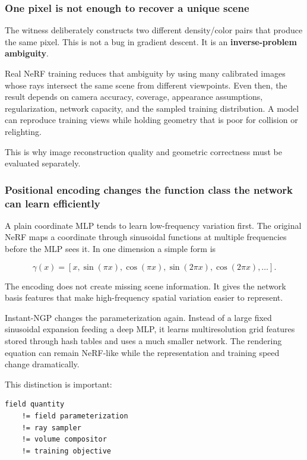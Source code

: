 \subsubsection{One pixel is not enough to recover a unique scene}\label{one-pixel-is-not-enough-to-recover-a-unique-scene}

The witness deliberately constructs two different density/color pairs that produce the same pixel. This is not a bug in gradient descent. It is an \textbf{inverse-problem ambiguity}.

Real NeRF training reduces that ambiguity by using many calibrated images whose rays intersect the same scene from different viewpoints. Even then, the result depends on camera accuracy, coverage, appearance assumptions, regularization, network capacity, and the sampled training distribution. A model can reproduce training views while holding geometry that is poor for collision or relighting.

This is why image reconstruction quality and geometric correctness must be evaluated separately.

\subsubsection{Positional encoding changes the function class the network can learn efficiently}\label{positional-encoding-changes-the-function-class-the-network-can-learn-efficiently}

A plain coordinate MLP tends to learn low-frequency variation first. The original NeRF maps a coordinate through sinusoidal functions at multiple frequencies before the MLP sees it. In one dimension a simple form is

\[\gamma(x)=\left[x,\sin(\pi x),\cos(\pi x),\sin(2\pi x),\cos(2\pi x),\ldots\right].\]

The encoding does not create missing scene information. It gives the network basis features that make high-frequency spatial variation easier to represent.

Instant-NGP changes the parameterization again. Instead of a large fixed sinusoidal expansion feeding a deep MLP, it learns multiresolution grid features stored through hash tables and uses a much smaller network. The rendering equation can remain NeRF-like while the representation and training speed change dramatically.

This distinction is important:

\begin{verbatim}
field quantity
    != field parameterization
    != ray sampler
    != volume compositor
    != training objective
\end{verbatim}

